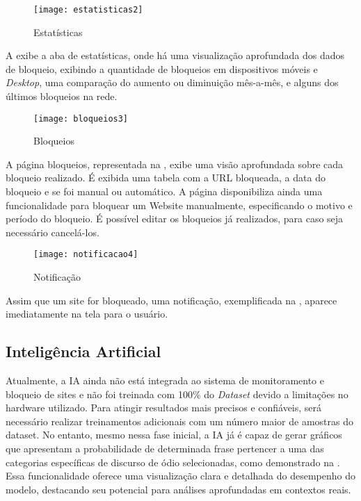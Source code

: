     \begin{figure}[H]
        \centering
        \caption{Estatísticas}%
        \label{fig:estatisticas}
        \texttt{[image: estatisticas2]}
        \end{figure}
        
        A  exibe a aba de estatísticas, onde há uma visualização aprofundada dos dados de bloqueio, exibindo a quantidade de bloqueios em dispositivos móveis e \textit{Desktop}, uma comparação do aumento ou diminuição mês-a-mês, e alguns dos últimos bloqueios na rede.
        
     \begin{figure}[H]
        \centering
        \caption{Bloqueios}%
        \label{fig:bloqueios}
        \texttt{[image: bloqueios3]}
        \end{figure}

    A página bloqueios, representada na , exibe uma visão aprofundada sobre cada bloqueio realizado. É exibida uma tabela com a URL bloqueada, a data do bloqueio e se foi manual ou automático. A página disponibiliza ainda uma funcionalidade para bloquear um Website manualmente, especificando o motivo e período do bloqueio. É possível editar os bloqueios já realizados, para caso seja necessário cancelá-los.

    \begin{figure}[H]
        \centering
        \caption{Notificação}%
        \label{fig:notificacao}
        \texttt{[image: notificacao4]}
        \end{figure}

        Assim que um site for bloqueado, uma notificação, exemplificada na , aparece imediatamente na tela para o usuário.

\subsection*{Inteligência Artificial}

Atualmente, a IA ainda não está integrada ao sistema de monitoramento e bloqueio de sites e não foi treinada com 100\% do \textit{Dataset} devido a limitações no hardware utilizado. Para atingir resultados mais precisos e confiáveis, será necessário realizar treinamentos adicionais com um número maior de amostras do dataset. No entanto, mesmo nessa fase inicial, a IA já é capaz de gerar gráficos que apresentam a probabilidade de determinada frase pertencer a uma das categorias específicas de discurso de ódio selecionadas, como demonstrado na . Essa funcionalidade oferece uma visualização clara e detalhada do desempenho do modelo, destacando seu potencial para análises aprofundadas em contextos reais.

